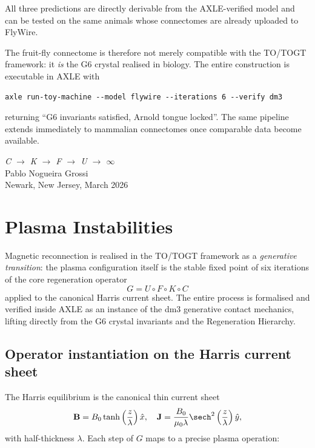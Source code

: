 \documentclass[19pt]{book}
\theoremstyle{plain}
\theoremstyle{definition}
\theoremstyle{remark}
\begin{document}
All three predictions are directly derivable from the AXLE-verified model and can be tested on the same animals whose connectomes are already uploaded to FlyWire.

The fruit-fly connectome is therefore not merely compatible with the TO/TOGT framework: it \emph{is} the G6 crystal realised in biology. The entire construction is executable in AXLE with
\begin{verbatim}
axle run-toy-machine --model flywire --iterations 6 --verify dm3
\end{verbatim}
returning “G6 invariants satisfied, Arnold tongue locked”. The same pipeline extends immediately to mammalian connectomes once comparable data become available.
\bigskip
\begin{flushright}
\textit{C \;$\to$\; K \;$\to$\; F \;$\to$\; U \;$\to$\; $\infty$}\\[0.3em]
Pablo Nogueira Grossi\\
Newark, New Jersey, March 2026
\end{flushright}
\chapter{Plasma Instabilities}

Magnetic reconnection is realised in the TO/TOGT framework as a \emph{generative transition}: the plasma configuration itself is the stable fixed point of six iterations of the core regeneration operator
\[
G = U \circ F \circ K \circ C
\]
applied to the canonical Harris current sheet. The entire process is formalised and verified inside AXLE as an instance of the dm3 generative contact mechanics, lifting directly from the G6 crystal invariants and the Regeneration Hierarchy.

\section{Operator instantiation on the Harris current sheet}

The Harris equilibrium is the canonical thin current sheet
\[
\mathbf{B} = B_0 \tanh\left(\frac{z}{\lambda}\right)\hat{x}, \quad
\mathbf{J} = \frac{B_0}{\mu_0\lambda}\sech^2\left(\frac{z}{\lambda}\right)\hat{y},
\]
with half-thickness \(\lambda\). Each step of \(G\) maps to a precise plasma operation:
\end{document}
